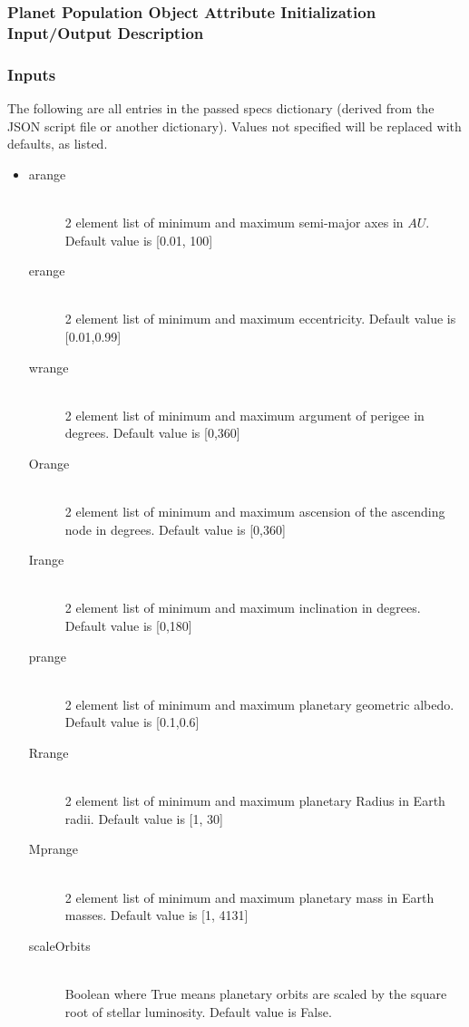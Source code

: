 \documentclass[cleanfoot]{asme2ej}
\begin{document}
\label{sec:planetpopulation}
\subsubsection{Planet Population Object Attribute Initialization Input/Output Description} 
\subsubsection*{Inputs}
The following are all entries in the passed specs dictionary (derived from the JSON script file or another dictionary).  Values not specified will be replaced with defaults, as listed.
\begin{itemize}
\item
\begin{description}
    \item[arange] \hfill \\
    2 element list of minimum and maximum semi-major axes in $ AU $. Default value is [0.01, 100]
    \item[erange] \hfill \\
    2 element list of minimum and maximum eccentricity.  Default value is [0.01,0.99]
    \item[wrange] \hfill \\
    2 element list of minimum and maximum argument of perigee in degrees.  Default value is [0,360]
    \item[Orange] \hfill \\
    2 element list of minimum and maximum ascension of the ascending node in degrees.  Default value is [0,360]
    \item[Irange] \hfill \\
    2 element list of minimum and maximum inclination in degrees.  Default value is [0,180]
    \item[prange] \hfill \\
    2 element list of minimum and maximum planetary geometric albedo.  Default value is [0.1,0.6]
     \item[Rrange] \hfill \\
    2 element list of minimum and maximum planetary Radius in Earth radii.  Default value is [1, 30]
    \item[Mprange] \hfill \\
    2 element list of minimum and maximum planetary mass in Earth masses.  Default value is [1, 4131]
    \item [scaleOrbits] \hfill \\
    Boolean where True means planetary orbits are scaled by the square root of stellar luminosity. Default value is False.
\end{description}
\end{itemize}
\end{document}
